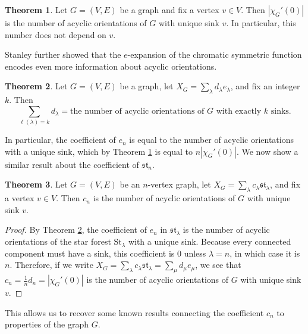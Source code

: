 \documentclass[12pt]{amsart}  %
\theoremstyle{definition}
\newtheorem{theorem}{Theorem}[section]
\theoremstyle{remark}
\numberwithin{equation}{section}
\begin{document}
\begin{theorem}\label{thm:chiacyclic} \cite[Theorem 7.3]{interpwhitney} Let $G=(V,E)$ be a graph and fix a vertex $v\in V$. Then $|\chi_G'(0)|$ is the number of acyclic orientations of $G$ with unique sink $v$. In particular, this number does not depend on $v$.
\end{theorem}

Stanley further showed that the $e$-expansion of the chromatic symmetric function encodes even more information about acyclic orientations.

\begin{theorem}\label{thm:xacyclic} \cite[Theorem 3.3]{chromsym}
Let $G=(V,E)$ be a graph, let $X_G=\sum_\lambda d_\lambda e_\lambda$, and fix an integer $k$. Then 
\begin{equation}
\sum_{\ell(\lambda)=k}d_\lambda=\text{the number of acyclic orientations of }G\text{ with exactly }k\text{ sinks.}
\end{equation}
\end{theorem}

In particular, the coefficient of $e_n$ is equal to the number of acyclic orientations with a unique sink, which by Theorem \ref{thm:chiacyclic} is equal to $n|\chi_G'(0)|$. We now show a similar result about the coefficient of $\mathfrak{st}_n$.

\begin{theorem}
Let $G=(V,E)$ be an $n$-vertex graph, let $X_G=\sum_\lambda c_\lambda\mathfrak{st}_\lambda$, and fix a vertex $v\in V$. Then $c_n$ is the number of acyclic orientations of $G$ with unique sink $v$. 
\end{theorem}

\begin{proof}
By Theorem \ref{thm:xacyclic}, the coefficient of $e_n$ in $\mathfrak{st}_\lambda$ is the number of acyclic orientations of the star forest $\text{St}_\lambda$ with a unique sink. Because every connected component must have a sink, this coefficient is $0$ unless $\lambda=n$, in which case it is $n$. Therefore, if we write $X_G=\sum_\lambda c_\lambda\mathfrak{st}_\lambda=\sum_\mu d_\mu e_\mu$, we see that $c_n=\frac 1n d_n=|\chi_G'(0)|$ is the number of acyclic orientations of $G$ with unique sink $v$. 
\end{proof}

This allows us to recover some known results connecting the coefficient $c_n$ to properties of the graph $G$.
\end{document}
